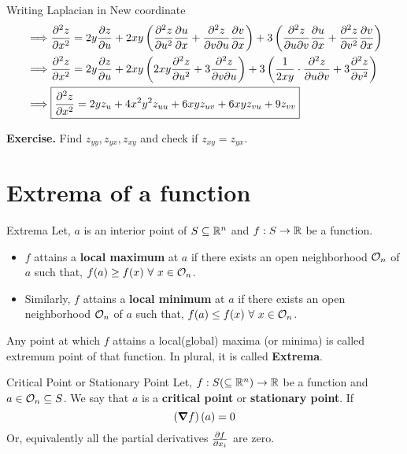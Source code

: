 \documentclass[../Analysis-3.tex]{subfiles}
\begin{document}
\begin{Eg}{Writing Laplacian in New coordinate}{}
\begin{align*}
        \implies     & \pdv[2]{z}{x} = 2y \pdv{z}{u} + 2xy \left(\pdv[2]{z}{u} \pdv{u}{x} + \pdv{z}{v}{u} \pdv{v}{x}\right)  + 3\left( \pdv{z}{u}{v} \pdv{u}{x} + \pdv[2]{z}{v} \pdv{v}{x}\right)                                                                                  \\
        \implies     & \pdv[2]{z}{x} = 2y \pdv{z}{u} + 2xy \left(2xy \pdv[2]{z}{u}  + 3 \pdv{z}{v}{u}\right)  + 3\left( \frac{1}{2xy}\cdot\pdv{z}{u}{v}  + 3\pdv[2]{z}{v}\right)                                                                                                   \\
        \implies     & \boxed{\pdv[2]{z}{x} = 2y z_u + 4x^2y^2z_{uu}+ 6xy z_{uv} + 6xy z_{vu} + 9z_{vv}}
    \end{align*}

\end{Eg}

\textbf{Exercise.} Find $z_{yy}, z_{yx}, z_{xy}$ and check if $z_{xy} = z_{yx}$.

\section{Extrema of a function}

\begin{Def}{Extrema}{}
    Let, $a$ is an interior point of $S \subseteq \mathbb{R}^n$ and $f : S \to \mathbb{R}$ be a function.

    \begin{itemize}
        \item $f$ attains a \textbf{local maximum} at $a$ if there exists an open neighborhood $\mathcal{O}_{n}$ of $a$ such that, $f(a) \geq f(x)\ \forall\ x \in \mathcal{O}_{n}$.
        \item Similarly, $f$ attains a \textbf{local minimum} at $a$ if there exists an open neighborhood $\mathcal{O}_{n}$ of $a$ such that, $f(a) \leq f(x)\ \forall\ x \in \mathcal{O}_{n}$.
    \end{itemize}

    Any point at which $f$ attains a local(global) maxima (or minima)  is called extremum point of that function. In plural, it is called \textbf{Extrema}.
\end{Def}

\begin{Def}{Critical Point or Stationary Point}{}
    Let, $f : S (\subseteq \mathbb{R}^n) \to \mathbb{R}$ be a function and $a \in \mathcal{O}_{n} \subseteq S$. We say that $a$ is a \textbf{critical point} or \textbf{stationary point}.
    If \[ \left(\grad f\right)(a) = 0\]
    Or, equivalently all the partial derivatives $\pdv{f}{x_i}$ are zero.
\end{Def}
\end{document}
